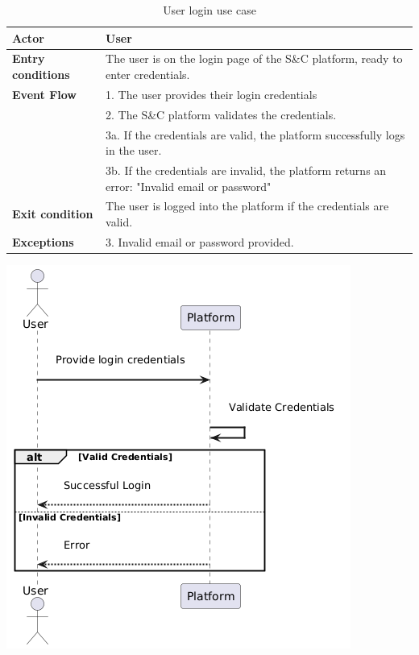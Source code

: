 \begin{table}[h!]
    \centering
    \begin{tabular}{lp{10cm}}
        \textbf{Actor} & User \\ \hline
        \textbf{Entry conditions} & The user is on the login page of the S\&C platform, ready to enter credentials. \\ \hline
        \textbf{Event Flow} &
        1. The user provides their login credentials \\
        & 2. The S\&C platform validates the credentials. \\
        & 3a. If the credentials are valid, the platform successfully logs in the user. \\
        & 3b. If the credentials are invalid, the platform returns an error: "Invalid email or password" \\
        \hline
        \textbf{Exit condition} & The user is logged into the platform if the credentials are valid. \\ \hline
        \textbf{Exceptions} &
        3. Invalid email or password provided. \\
    \end{tabular}
    \caption{User login use case}
    \label{tab:user_login}
\end{table}


\begin{center}
    \includegraphics[scale = 1]{Images/ImagesRASD/user_login.png}
\end{center}

